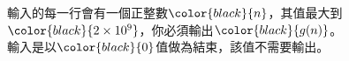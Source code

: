 輸入的每一行會有一個正整數$\color{black}{\space n\space}$，其值最大到$\color{black}{\space 2\times 10^9\space}$，你必須輸出$\color{black}{\space g(n)\space}$。\\
輸入是以$\color{black}{\space 0\space}$值做為結束，該值不需要輸出。\\
